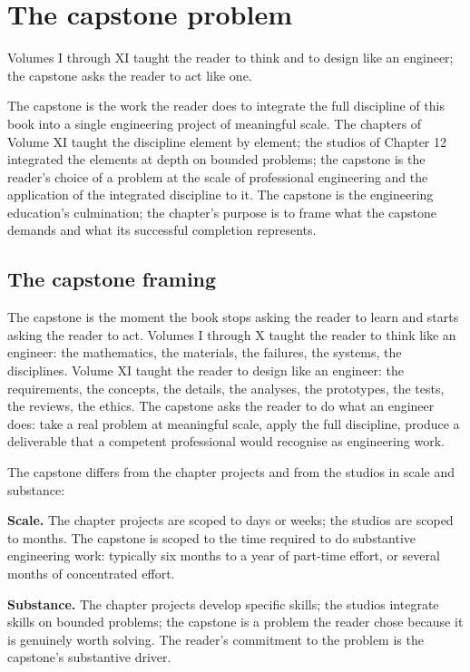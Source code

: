 \chapter{The capstone problem}
\label{vol11:ch13}

\epigraph{Volumes I through XI taught the reader to think and to design like an engineer; the capstone asks the reader to act like one.}{}


\noindent
The capstone is the work the reader does to integrate the full discipline of this book into a single engineering project of meaningful scale. The chapters of Volume XI taught the discipline element by element; the studios of Chapter 12 integrated the elements at depth on bounded problems; the capstone is the reader's choice of a problem at the scale of professional engineering and the application of the integrated discipline to it. The capstone is the engineering education's culmination; the chapter's purpose is to frame what the capstone demands and what its successful completion represents.

\section{The capstone framing}

The capstone is the moment the book stops asking the reader to learn and starts asking the reader to act. Volumes I through X taught the reader to think like an engineer: the mathematics, the materials, the failures, the systems, the disciplines. Volume XI taught the reader to design like an engineer: the requirements, the concepts, the details, the analyses, the prototypes, the tests, the reviews, the ethics. The capstone asks the reader to do what an engineer does: take a real problem at meaningful scale, apply the full discipline, produce a deliverable that a competent professional would recognise as engineering work.

The capstone differs from the chapter projects and from the studios in scale and substance:

\textbf{Scale.} The chapter projects are scoped to days or weeks; the studios are scoped to months. The capstone is scoped to the time required to do substantive engineering work: typically six months to a year of part-time effort, or several months of concentrated effort.

\textbf{Substance.} The chapter projects develop specific skills; the studios integrate skills on bounded problems; the capstone is a problem the reader chose because it is genuinely worth solving. The reader's commitment to the problem is the capstone's substantive driver.


